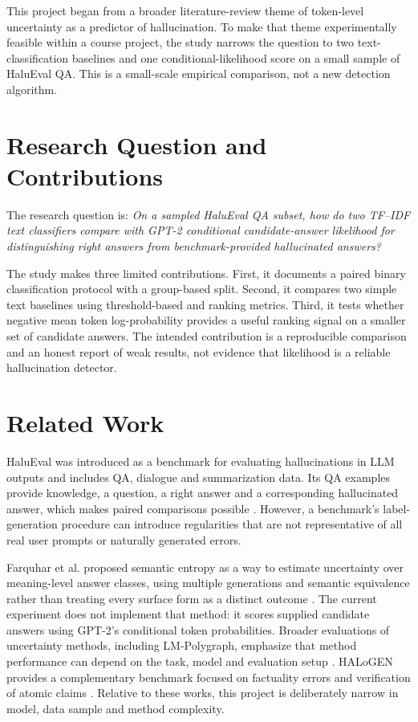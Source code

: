 \documentclass[11pt]{article}
\begin{document}
This project began from a broader literature-review theme of token-level uncertainty as a predictor of hallucination. To make that theme experimentally feasible within a course project, the study narrows the question to two text-classification baselines and one conditional-likelihood score on a small sample of HaluEval QA. This is a small-scale empirical comparison, not a new detection algorithm.

\section{Research Question and Contributions}
The research question is: \emph{On a sampled HaluEval QA subset, how do two TF--IDF text classifiers compare with GPT-2 conditional candidate-answer likelihood for distinguishing right answers from benchmark-provided hallucinated answers?}

The study makes three limited contributions. First, it documents a paired binary classification protocol with a group-based split. Second, it compares two simple text baselines using threshold-based and ranking metrics. Third, it tests whether negative mean token log-probability provides a useful ranking signal on a smaller set of candidate answers. The intended contribution is a reproducible comparison and an honest report of weak results, not evidence that likelihood is a reliable hallucination detector.

\section{Related Work}
HaluEval was introduced as a benchmark for evaluating hallucinations in LLM outputs and includes QA, dialogue and summarization data. Its QA examples provide knowledge, a question, a right answer and a corresponding hallucinated answer, which makes paired comparisons possible \cite{li2023halueval}. However, a benchmark's label-generation procedure can introduce regularities that are not representative of all real user prompts or naturally generated errors.

Farquhar et al. proposed semantic entropy as a way to estimate uncertainty over meaning-level answer classes, using multiple generations and semantic equivalence rather than treating every surface form as a distinct outcome \cite{farquhar2024semantic}. The current experiment does not implement that method: it scores supplied candidate answers using GPT-2's conditional token probabilities. Broader evaluations of uncertainty methods, including LM-Polygraph, emphasize that method performance can depend on the task, model and evaluation setup \cite{vashurin2025polygraph}. HALoGEN provides a complementary benchmark focused on factuality errors and verification of atomic claims \cite{ravichander2025halogen}. Relative to these works, this project is deliberately narrow in model, data sample and method complexity.
\end{document}
